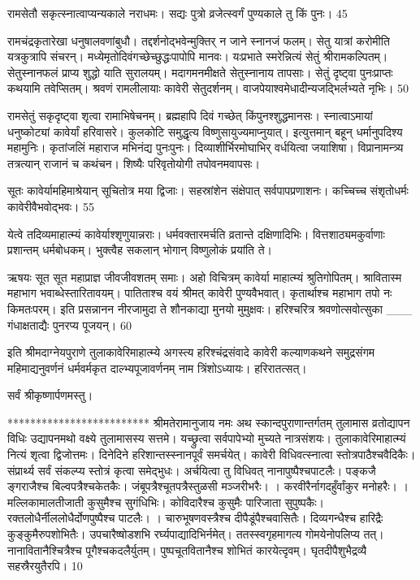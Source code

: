 रामसेतौ सकृत्स्नात्वाप्यन्यकाले नराधमः।
 सद्यः पुत्रो व्रजेत्स्वर्गं पुण्यकाले तु किं पुनः।
 45

  रामचंद्रकृतारेखा धनुषालवणांबुधौ।
 तद्दर्शनोद्भवेन्मुक्तिर् न जाने स्नानजं फलम्।
 सेतु यात्रां करोमीति यत्रकुत्रापि संचरन्।
 मध्येमृतोदिवंगच्छेच्छुद्धःपापोपि मानवः।
 यःप्रभाते स्मरेन्नित्यं सेतुं श्रीरामकल्पितम्।
 सेतुस्नानफलं प्राप्य शुद्धो याति सुरालयम्।
 मदागमनमीक्षते सेतुस्नानाय तापसाः।
 सेतुं दृष्ट्वा पुनःप्राप्तः कथयामि तवेप्सितम्।
 श्रवणं रामलीलायाः कावेरी सेतुदर्शनम्।
 वाजपेयाश्वमेधादीन्यजद्भिर्लभ्यते नृभिः।
 50

  रामसेतुं सकृदृष्ट्वा शृत्वा रामाभिषेचनम्।
 ब्रह्महापि दिवं गच्छेत् किंपुनश्शुद्धमानसः।
 स्नात्वाऽमायां धनुष्कोट्यां कावेर्यां हरिवासरे।
 कुलकोटि समुद्धृत्य विष्णुसायुज्यमाप्नुयात्।
 इत्युत्तमान् बहून् धर्मानुपदिश्य महामुनिः।
 कृतांजलिं महाराज मभिनंद्य पुनःपुनः।
 दिव्याशीर्भिरमोघाभिर् वर्धयित्वा जयाशिषा।
 विप्रानामन्त्र्य तत्रत्यान् राजानं च कथंचन।
 शिष्यैः परिवृतोयोगी तपोवनमवापसः।
 
सूतः
कावेर्यामहिमाश्रेयान् सूचितोत्र मया द्विजाः।
 सहस्रांशेन संक्षेपात् सर्वपापप्रणाशनः।
 कच्चिच्च संशृतोधर्मः कावेरीवैभवोद्भवः।
 55

  येत्वे तदिव्यमाहात्म्यं कावेर्याश्शृणुयान्नराः।
 धर्मवक्तारमर्चति व्रतान्ते दक्षिणादिभिः।
 वित्तशाठ्यमकुर्वाणाः प्रशान्तम् धर्मबोधकम्।
 भुक्त्वैह सकलान् भोगान् विष्णुलोकं प्रयांति ते।
 
ऋषयः
सूत सूत महाप्राज्ञ जीवजीवशतम् समाः।
 अहो विचित्रम् कावेर्या माहात्म्यं श्रुतिगोपितम्।
 श्रावितास्म महाभाग भवाब्धेस्तारितावयम्।
 पातिताश्च वयं श्रीमत् कावेरी पुण्यवैभवात्।
 कृतार्थाश्च महाभाग तपो नः किमतःपरम्।
 इति प्रसन्नानन नीरजामुदा ते
शौनकाद्या मुनयो मुमुक्षवः।
 हरिश्चरित्र श्रवणोत्सवोत्सुका
___ गंधाक्षताद्यैः पुनरप्य पूजयन्।
 60

  इति श्रीमदाग्नेयपुराणे तुलाकावेरिमाहात्म्ये अगस्त्य हरिश्चंद्रसंवादे कावेरी कल्याणकथने समुद्रसंगम महिमाद्यनुवर्णनं धर्मवर्मकृत दाल्भ्यपूजावर्णनम्
नाम त्रिंशोऽध्यायः।
 हरिरातत्सत्।
 
सर्वं श्रीकृष्णार्पणमस्तु।

*************************
श्रीमतेरामानुजाय नमः अथ स्कान्दपुराणान्तर्गतम्
तुलामास व्रतोद्यापन विधिः उद्यापनमथो वक्ष्ये तुलामासस्य सत्तमे।
 यच्छ्रुत्वा सर्वपापेभ्यो मुच्यते नात्रसंशयः।
 तुलाकावेरिमाहात्म्यं नित्यं शृत्वा द्विजोत्तमः।
 दिनेदिने हरिशान्तस्स्नानपूर्वं समर्चयेत्।
 कावेरी विधिवत्स्नात्वा स्तोत्रपाठैश्चवैदिकैः।
 संप्रार्थ्य सर्वं संकल्प्य स्तोत्रं कृत्वा समेद्भुधः।
 अर्चयित्वा तु विधिवत् नानापुष्पैश्चपाटलैः।
 पङ्कजै ङ्गराजैश्च बिल्वपत्रैश्चकेतकैः।
 जंबूपत्रैश्चूतपत्रैस्तुळसी मञ्जरीभरैः।
 ।
 करवीरैर्नागदहुँर्वांकुर मनोहरैः।
 ।
 मल्लिकामालतीजाती कुसुमैश्च सुगंधिभिः।
 कोविदारैश्च कुसुमैः पारिजाता सुपुष्पकैः।
 रक्तलोधैर्नीललोधैर्दोणपुष्पैश्च पाटलैः।
 ।
 चारुभूषणवस्त्रैश्च दीपैडूंपैश्चवासितैः।
 दिव्यगन्धैश्च हारिद्रैः कुङ्कुमैरुपशोभितैः।
 उपचारैष्षोडशभि रर्घ्यपाद्यादिभिर्नमेत्।
 ततस्स्वगृहमागत्य गोमयेनोपलिप्य तत्।
 नानावितानैश्चित्रैश्च पूगैश्चकदलैर्युतम्।
 पुष्पचूतवितानैश्च शोभितं कारयेत्दृवम्।
 घृतदीपैशुभैद्रव्यै सहस्रैरयुतैरपि।
 10

